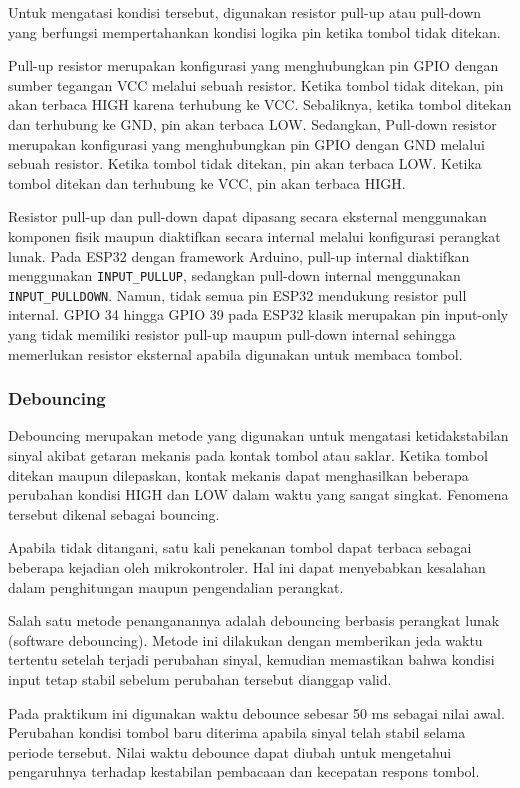 Untuk mengatasi kondisi tersebut, digunakan resistor pull-up atau pull-down yang berfungsi mempertahankan kondisi logika pin ketika tombol tidak ditekan.

Pull-up resistor merupakan konfigurasi yang menghubungkan pin GPIO dengan sumber tegangan VCC melalui sebuah resistor. Ketika tombol tidak ditekan, pin akan terbaca HIGH karena terhubung ke VCC. Sebaliknya, ketika tombol ditekan dan terhubung ke GND, pin akan terbaca LOW. Sedangkan, Pull-down resistor merupakan konfigurasi yang menghubungkan pin GPIO dengan GND melalui sebuah resistor. Ketika tombol tidak ditekan, pin akan terbaca LOW. Ketika tombol ditekan dan terhubung ke VCC, pin akan terbaca HIGH.

Resistor pull-up dan pull-down dapat dipasang secara eksternal menggunakan komponen fisik maupun diaktifkan secara internal melalui konfigurasi perangkat lunak. Pada ESP32 dengan framework Arduino, pull-up internal diaktifkan menggunakan \texttt{INPUT\_PULLUP}, sedangkan pull-down internal menggunakan \texttt{INPUT\_PULLDOWN}. Namun, tidak semua pin ESP32 mendukung resistor pull internal. GPIO 34 hingga GPIO 39 pada ESP32 klasik merupakan pin input-only yang tidak memiliki resistor pull-up maupun pull-down internal sehingga memerlukan resistor eksternal apabila digunakan untuk membaca tombol.

\subsubsection{Debouncing}
Debouncing merupakan metode yang digunakan untuk mengatasi ketidakstabilan sinyal akibat getaran mekanis pada kontak tombol atau saklar. Ketika tombol ditekan maupun dilepaskan, kontak mekanis dapat menghasilkan beberapa perubahan kondisi HIGH dan LOW dalam waktu yang sangat singkat. Fenomena tersebut dikenal sebagai bouncing.

Apabila tidak ditangani, satu kali penekanan tombol dapat terbaca sebagai beberapa kejadian oleh mikrokontroler. Hal ini dapat menyebabkan kesalahan dalam penghitungan maupun pengendalian perangkat.

Salah satu metode penanganannya adalah debouncing berbasis perangkat lunak (software debouncing). Metode ini dilakukan dengan memberikan jeda waktu tertentu setelah terjadi perubahan sinyal, kemudian memastikan bahwa kondisi input tetap stabil sebelum perubahan tersebut dianggap valid.

Pada praktikum ini digunakan waktu debounce sebesar 50 ms sebagai nilai awal. Perubahan kondisi tombol baru diterima apabila sinyal telah stabil selama periode tersebut. Nilai waktu debounce dapat diubah untuk mengetahui pengaruhnya terhadap kestabilan pembacaan dan kecepatan respons tombol.

